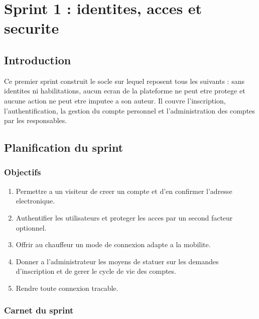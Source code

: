 \chapter{Sprint 1 : identites, acces et securite}
\label{chap:sprint1}

\section*{Introduction}

Ce premier sprint construit le socle sur lequel reposent tous les
suivants : sans identites ni habilitations, aucun ecran de la plateforme
ne peut etre protege et aucune action ne peut etre imputee a son auteur.
Il couvre l'inscription, l'authentification, la gestion du compte
personnel et l'administration des comptes par les responsables.

\section{Planification du sprint}

\subsection{Objectifs}

\begin{enumerate}
  \item Permettre a un visiteur de creer un compte et d'en confirmer
    l'adresse electronique.
  \item Authentifier les utilisateurs et proteger les acces par un second
    facteur optionnel.
  \item Offrir au chauffeur un mode de connexion adapte a la mobilite.
  \item Donner a l'administrateur les moyens de statuer sur les demandes
    d'inscription et de gerer le cycle de vie des comptes.
  \item Rendre toute connexion tracable.
\end{enumerate}

\subsection{Carnet du sprint}

